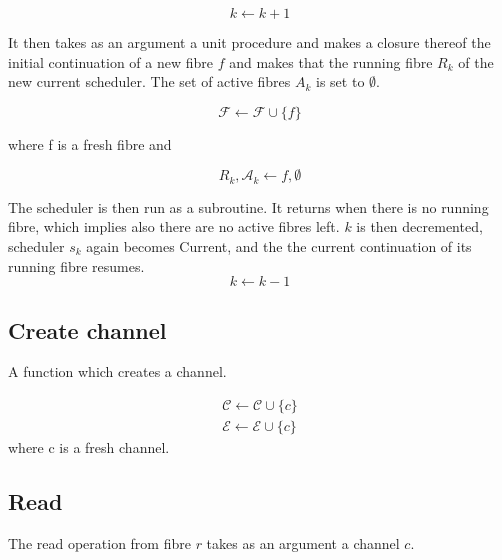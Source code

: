 \documentclass[oneside]{book}
\begin{document}
\begin{equation}
k \leftarrow k + 1
\end{equation}


It then takes as an argument a unit procedure and makes
a closure thereof the initial continuation
of a new fibre $f$ and makes that the running fibre $R_k$ of
the new current scheduler. The set of active fibres $A_k$
is set to $\emptyset$. 

 
\begin{equation}
{\mathcal F} \leftarrow {\mathcal F} \cup \{f\}
\end{equation}

where f is a fresh fibre and

\begin{equation}
R_k,\mathcal A_k \leftarrow
f,\emptyset
\end{equation}

The scheduler is then run as a subroutine. It returns when there
is no running fibre, which implies also there are no active
fibres left. $k$ is then decremented, scheduler $s_k$ again becomes Current, 
and the the
current continuation of its running fibre resumes.
\begin{equation}
k \leftarrow k - 1
\end{equation}

\subsection{Create channel}
A function which creates a channel.

\begin{align}
{\mathcal C} \leftarrow {\mathcal C} \cup \{c\}\\
{\mathcal E} \leftarrow {\mathcal E} \cup \{c\}
\end{align}
where c is a fresh channel.

\subsection{Read}
The read operation from fibre $r$ takes as an argument a channel $c$.
\end{document}
